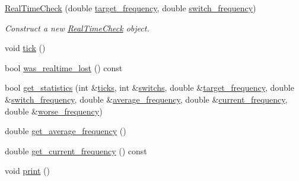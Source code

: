 \begin{DoxyCompactItemize}
\item 
\hyperlink{classreal__time__tools_1_1RealTimeCheck_a2f26472092432e628167f89a3a19e27e}{Real\+Time\+Check} (double \hyperlink{classreal__time__tools_1_1RealTimeCheck_a126c13a50d06703c515b35f87c3e867c}{target\+\_\+frequency}, double \hyperlink{classreal__time__tools_1_1RealTimeCheck_a235895032a789539a8ba957caac621ec}{switch\+\_\+frequency})
\begin{DoxyCompactList}\small\item\em Construct a new \hyperlink{classreal__time__tools_1_1RealTimeCheck}{Real\+Time\+Check} object. \end{DoxyCompactList}\item 
void \hyperlink{classreal__time__tools_1_1RealTimeCheck_a83fdf97352d36aa20e482d7dfae442d5}{tick} ()
\item 
bool \hyperlink{classreal__time__tools_1_1RealTimeCheck_af4fcff0b49162ff802192c2e4832568a}{was\+\_\+realtime\+\_\+lost} () const 
\item 
bool \hyperlink{classreal__time__tools_1_1RealTimeCheck_a4d9614b08d2b4bf7162e14c473b7d491}{get\+\_\+statistics} (int \&\hyperlink{classreal__time__tools_1_1RealTimeCheck_ae2acb20d9f1e49cc35eb5505d63201aa}{ticks}, int \&\hyperlink{classreal__time__tools_1_1RealTimeCheck_acc235579eeb245f043fd188790540fa9}{switchs}, double \&\hyperlink{classreal__time__tools_1_1RealTimeCheck_a126c13a50d06703c515b35f87c3e867c}{target\+\_\+frequency}, double \&\hyperlink{classreal__time__tools_1_1RealTimeCheck_a235895032a789539a8ba957caac621ec}{switch\+\_\+frequency}, double \&\hyperlink{classreal__time__tools_1_1RealTimeCheck_a3ffb6de7e7c01a7248c2293e29b98011}{average\+\_\+frequency}, double \&\hyperlink{classreal__time__tools_1_1RealTimeCheck_a935b4c6b8ebf569e6510d47376f8499f}{current\+\_\+frequency}, double \&\hyperlink{classreal__time__tools_1_1RealTimeCheck_a3605c41d8c5c616879fa9af469860470}{worse\+\_\+frequency})
\item 
double \hyperlink{classreal__time__tools_1_1RealTimeCheck_a2b891d59055829fab442ba4c382778e3}{get\+\_\+average\+\_\+frequency} ()
\item 
double \hyperlink{classreal__time__tools_1_1RealTimeCheck_a1cd5c3fb05a46970361064348c57197d}{get\+\_\+current\+\_\+frequency} () const 
\item 
void \hyperlink{classreal__time__tools_1_1RealTimeCheck_a9c9c68da79843098085204095286a143}{print} ()
\end{DoxyCompactItemize}
